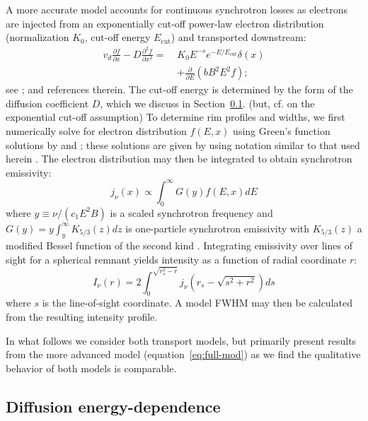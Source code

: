 \documentclass[iop, apj, numberedappendix, twocolappendix]{emulateapj}
\newcommand*{\mt}{\mathrm}
\newcommand*{\ptl}{\partial}
\newcommand*{\Ecut}{E_{\mt{cut}}}
\begin{document}
A more accurate model accounts for continuous synchrotron losses as electrons
are injected from an exponentially cut-off power-law electron distribution
(normalization $K_0$, cut-off energy $\Ecut$) and transported downstream:
\begin{align} \label{eq:full-mod}
    v_d \frac{\ptl f}{\ptl x} - D \frac{\ptl^2 f}{\ptl x^2} =\;
    &K_0 E^{-s} e^{-E/\Ecut} \delta(x) \nonumber \\
    &+ \frac{\ptl}{\ptl E} \left(bB^2E^2f\right) ;
\end{align}
see \citet{berezhko2004, cassam-chenai2007, morlino2010, rettig2012}; and
references therein.  The cut-off energy is determined by the form of the
diffusion coefficient $D$, which we discuss in Section~\ref{sec:diffcoeff}.
(but, cf. \citet{zirakashvili2007} on the exponential cut-off assumption) To
determine rim profiles and widths, we first numerically solve for electron
distribution $f(E,x)$ using Green's function solutions by \citet{lerche1980}
and \citet{rettig2012}; these solutions are given by 
using notation similar to that used herein .  The electron
distribution may then be integrated to obtain synchrotron emissivity:
\begin{equation} \label{eq:emissivity}
    j_{\nu}(x) \propto \int_0^\infty G(y) f(E,x) dE
\end{equation}
where $y \equiv \nu/(c_1 E^2 B)$ is a scaled synchrotron frequency and
$G(y) = y \int_y^\infty K_{5/3}(z) dz$ is one-particle synchrotron emissivity
with $K_{5/3}(z)$ a modified Bessel function of the second kind
\citep{pacholczyk1970}.  Integrating emissivity over lines of sight for a
spherical remnant yields intensity as a function of radial coordinate $r$:
\begin{equation} \label{eq:intensity}
    I_{\nu}(r) = 2 \int_0^{\sqrt{r_s^2 - r}}
                    j_{\nu} \left( r_s - \sqrt{s^2 + r^2} \right) ds
\end{equation}
where $s$ is the line-of-sight coordinate.  A model FWHM may then be calculated
from the resulting intensity profile.

In what follows we consider both transport models, but primarily present
results from the more advanced model (equation~\eqref{eq:full-mod}) as we find
the qualitative behavior of both models is comparable.

\subsection{Diffusion energy-dependence} \label{sec:diffcoeff}
\end{document}
